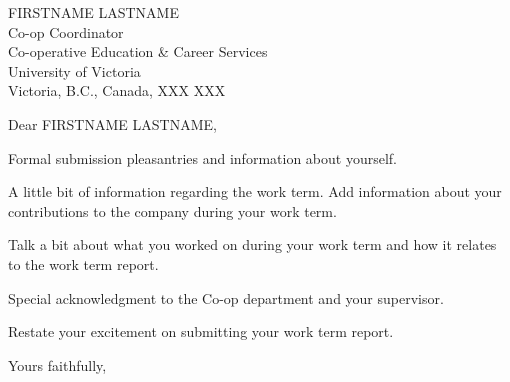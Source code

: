 \documentclass[12pt]{letter}
\date{MONTH DAY, YEAR} %
\begin{document}
\begin{letter}{
    FIRSTNAME LASTNAME \\
    Co-op Coordinator \\
    Co-operative Education \& Career Services \\
    University of Victoria \\
    Victoria, B.C., Canada, XXX XXX %
}

    \opening{Dear FIRSTNAME LASTNAME,}

    Formal submission pleasantries and information about yourself.

    A little bit of information regarding the work term. Add information about your contributions to the company during your work term.

    Talk a bit about what you worked on during your work term and how it relates to the work term report.

    Special acknowledgment to the Co-op department and your supervisor.

    Restate your excitement on submitting your work term report.

  \closing{Yours faithfully,}

\end{letter}
\end{document}

